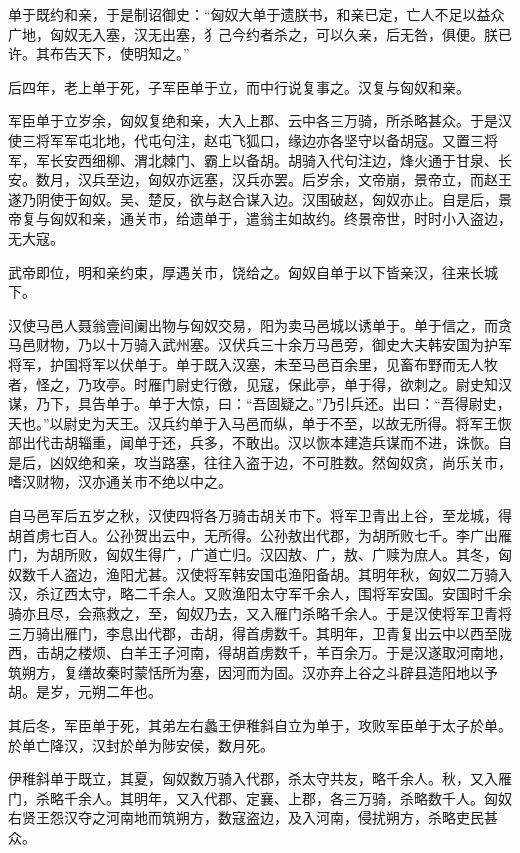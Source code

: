 \documentclass[]{article}
\begin{document}
单于既约和亲，于是制诏御史：``匈奴大单于遗朕书，和亲已定，亡人不足以益众广地，匈奴无入塞，汉无出塞，犭己今约者杀之，可以久亲，后无咎，俱便。朕已许。其布告天下，使明知之。''

后四年，老上单于死，子军臣单于立，而中行说复事之。汉复与匈奴和亲。

军臣单于立岁余，匈奴复绝和亲，大入上郡、云中各三万骑，所杀略甚众。于是汉使三将军军屯北地，代屯句注，赵屯飞狐口，缘边亦各坚守以备胡寇。又置三将军，军长安西细柳、渭北棘门、霸上以备胡。胡骑入代句注边，烽火通于甘泉、长安。数月，汉兵至边，匈奴亦远塞，汉兵亦罢。后岁余，文帝崩，景帝立，而赵王遂乃阴使于匈奴。吴、楚反，欲与赵合谋入边。汉围破赵，匈奴亦止。自是后，景帝复与匈奴和亲，通关市，给遗单于，遣翁主如故约。终景帝世，时时小入盗边，无大寇。

武帝即位，明和亲约束，厚遇关市，饶给之。匈奴自单于以下皆亲汉，往来长城下。

汉使马邑人聂翁壹间阑出物与匈奴交易，阳为卖马邑城以诱单于。单于信之，而贪马邑财物，乃以十万骑入武州塞。汉伏兵三十余万马邑旁，御史大夫韩安国为护军将军，护国将军以伏单于。单于既入汉塞，未至马邑百余里，见畜布野而无人牧者，怪之，乃攻亭。时雁门尉史行徼，见寇，保此亭，单于得，欲刺之。尉史知汉谋，乃下，具告单于。单于大惊，曰：``吾固疑之。''乃引兵还。出曰：``吾得尉史，天也。''以尉史为天王。汉兵约单于入马邑而纵，单于不至，以故无所得。将军王恢部出代击胡辎重，闻单于还，兵多，不敢出。汉以恢本建造兵谋而不进，诛恢。自是后，凶奴绝和亲，攻当路塞，往往入盗于边，不可胜数。然匈奴贪，尚乐关市，嗜汉财物，汉亦通关市不绝以中之。

自马邑军后五岁之秋，汉使四将各万骑击胡关市下。将军卫青出上谷，至龙城，得胡首虏七百人。公孙贺出云中，无所得。公孙敖出代郡，为胡所败七千。李广出雁门，为胡所败，匈奴生得广，广道亡归。汉囚敖、广，敖、广赎为庶人。其冬，匈奴数千人盗边，渔阳尤甚。汉使将军韩安国屯渔阳备胡。其明年秋，匈奴二万骑入汉，杀辽西太守，略二千余人。又败渔阳太守军千余人，围将军安国。安国时千余骑亦且尽，会燕救之，至，匈奴乃去，又入雁门杀略千余人。于是汉使将军卫青将三万骑出雁门，李息出代郡，击胡，得首虏数千。其明年，卫青复出云中以西至陇西，击胡之楼烦、白羊王子河南，得胡首虏数千，羊百余万。于是汉遂取河南地，筑朔方，复缮故秦时蒙恬所为塞，因河而为固。汉亦弃上谷之斗辟县造阳地以予胡。是岁，元朔二年也。

其后冬，军臣单于死，其弟左右蠡王伊稚斜自立为单于，攻败军臣单于太子於单。於单亡降汉，汉封於单为陟安侯，数月死。

伊稚斜单于既立，其夏，匈奴数万骑入代郡，杀太守共友，略千余人。秋，又入雁门，杀略千余人。其明年，又入代郡、定襄、上郡，各三万骑，杀略数千人。匈奴右贤王怨汉夺之河南地而筑朔方，数寇盗边，及入河南，侵扰朔方，杀略吏民甚众。
\end{document}

